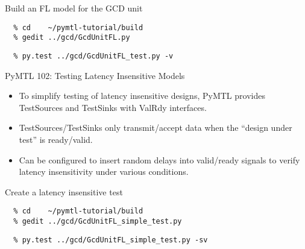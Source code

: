 \begin{task}\begin{frame}[fragile]{Build an FL model for the GCD unit}
\vspace{-0.25in}
\begin{verbatim}
  % cd    ~/pymtl-tutorial/build
  % gedit ../gcd/GcdUnitFL.py
\end{verbatim}


\vspace{-0.3in}
\begin{verbatim}
  % py.test ../gcd/GcdUnitFL_test.py -v
\end{verbatim}
\end{frame}
\end{task}

\begin{frame}{PyMTL 102: Testing Latency Insensitive Models}

\begin{itemize}
  \item To simplify testing of latency insensitive designs, PyMTL provides
        TestSources and TestSinks with ValRdy interfaces.
  \smallskip
  \item TestSources/TestSinks only transmit/accept data when the ``design
        under test'' is ready/valid.
  \smallskip
  \item Can be configured to insert random delays into valid/ready signals
        to verify latency insensitivity under various conditions.
\end{itemize}

\end{frame}

\begin{task}\begin{frame}[fragile]{Create a latency insensitive test}
\vspace{-0.25in}
\begin{verbatim}
  % cd    ~/pymtl-tutorial/build
  % gedit ../gcd/GcdUnitFL_simple_test.py
\end{verbatim}


\vspace{-0.3in}
\begin{verbatim}
  % py.test ../gcd/GcdUnitFL_simple_test.py -sv
\end{verbatim}
\end{frame}
\end{task}

